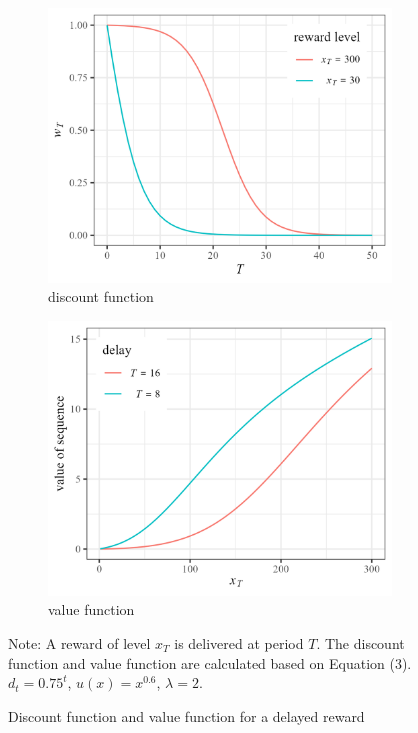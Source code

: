 \documentclass[
  12pt,
]{article}
\begin{document}
\begin{figure}[h]
    \centering
    \begin{subfigure}{0.49\textwidth}
        \centering
        \includegraphics[width=\linewidth]{figures/concave_discount.png} 
        \caption{discount function}
    \end{subfigure}
    \hfill
    \begin{subfigure}{0.49\textwidth}
        \centering
        \includegraphics[width=\linewidth]{figures/s_shape_value.png}
        \caption{value function}
    \end{subfigure}
    \caption{Discount function and value function for a delayed reward}

  \vspace{8pt}
  \begin{minipage}{1.0\textwidth}
{\par\footnotesize Note: A reward of level $x_T$ is delivered at period $T$. The discount function and value function are calculated based on Equation (3). $d_t=0.75^t$, $u(x)=x^{0.6}$, $\lambda=2$.}
\end{minipage}
    
    \label{fig:discount_value_function}
\end{figure}
\end{document}
